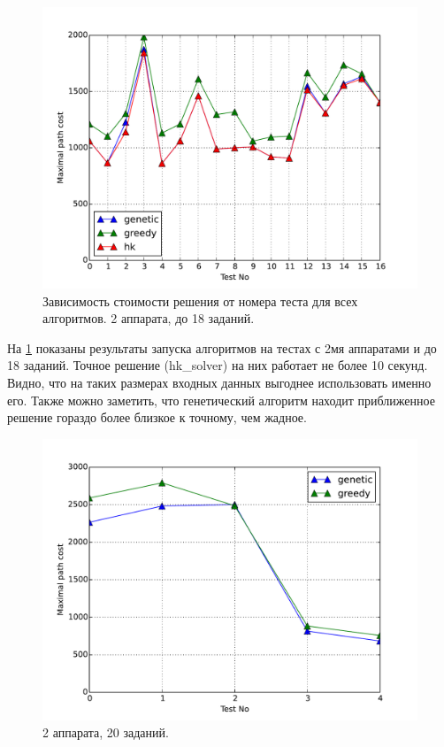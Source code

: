 \documentclass[a4paper,14pt,russian]{article}
\begin{document}
\begin{figure}[here]
\includegraphics[scale=0.6]{images/small-tests.pdf}
\caption{Зависимость стоимости решения от номера теста для всех алгоритмов. 2 аппарата, до 18 заданий.}
\label{fig:alg_small}
\end{figure}
\pagebreak

На \cref{fig:alg_small} показаны результаты запуска алгоритмов на тестах с 2мя аппаратами и до 18 заданий. Точное решение (hk\_solver) на них работает не более 10 секунд. Видно, что на таких размерах входных данных выгоднее использовать именно его. Также можно заметить, что генетический алгоритм находит приближенное решение гораздо более близкое к точному, чем жадное.

\begin{figure}[here]
\includegraphics[scale=0.8]{images/20figure5.pdf}
\caption{2 аппарата, 20 заданий.}
\label{fig:alg20}
\end{figure}
\pagebreak
\end{document}
